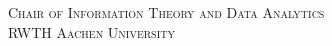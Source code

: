 \vfill %
\vspace*{30mm}
{\large \textsc{Chair of Information Theory and Data Analytics}}\\[0.5\baselineskip] %
{\large \textsc{RWTH Aachen University}}\par %
%
%
\twolinesbottom
\endgroup

\cleardoublepage

